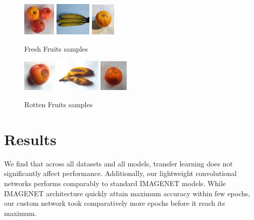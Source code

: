 \documentclass[11pt]{article}
\begin{document}
\begin{figure}[h]
    \centering
    \includegraphics[width= 0.14\textwidth]{images/app.jpg} 
    \includegraphics[width= 0.153\textwidth]{images/ban.jpg} 
    \includegraphics[width= 0.105\textwidth]{images/freshorange.jpg} 
    \caption{Fresh Fruits samples}
    \label{fig:example_label}
\end{figure}

\begin{figure}[h]
    \centering


    \includegraphics[width= 0.145\textwidth]{images/rottenapple.jpg} 
    \includegraphics[width= 0.19\textwidth]{images/rottenbanana.jpg}    \includegraphics[width= 0.122\textwidth]{images/rottenorange.jpg} 
    \caption{Rotten Fruits samples}
    \label{fig:example_label}
\end{figure}



\section{Results}
We find that across all datasets and all models, transfer learning does not significantly affect performance. Additionally, our lightweight convolutional networks performs comparably to standard IMAGENET models. 
While IMAGENET architecture quickly attain maximum accuracy within few epochs, our custom network took comparatively more epochs before it reach its maximum. 
\end{document}
